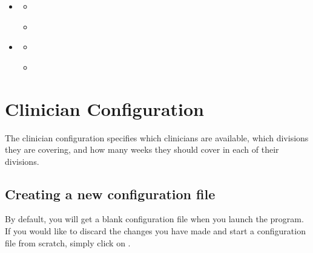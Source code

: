 \documentclass[letterpaper,10pt,english]{sphinxmanual}
\begin{document}
\begin{sphinxShadowBox}
\begin{itemize}
\begin{itemize}
\item {} 
\label{\detokenize{manual:id13}}{\hyperref[\detokenize{manual:holiday-weekends-excel-file}]{}}

\end{itemize}

\item {} 
\label{\detokenize{manual:id14}}{\hyperref[\detokenize{manual:scheduling}]{}}
\begin{itemize}
\item {} 
\label{\detokenize{manual:id15}}{\hyperref[\detokenize{manual:generating-a-schedule}]{}}

\item {} 
\label{\detokenize{manual:id16}}{\hyperref[\detokenize{manual:exporting-a-schedule}]{}}

\end{itemize}

\item {} 
\label{\detokenize{manual:id17}}{\hyperref[\detokenize{manual:sample-output}]{}}
\begin{itemize}
\item {} 
\label{\detokenize{manual:id18}}{\hyperref[\detokenize{manual:yearly-excel-format}]{}}

\item {} 
\label{\detokenize{manual:id19}}{\hyperref[\detokenize{manual:monthly-excel-format}]{}}

\end{itemize}

\end{itemize}
\end{sphinxShadowBox}


\chapter{Clinician Configuration}
\label{\detokenize{manual:clinician-configuration}}\label{\detokenize{manual:id1}}
The clinician configuration specifies which clinicians are available,
which divisions they are covering, and how many weeks they should cover
in each of their divisions.


\section{Creating a new configuration file}
\label{\detokenize{manual:creating-a-new-configuration-file}}
By default, you will get a blank configuration file when you launch
the program. If you would like to discard the changes you have made and
start a configuration file from scratch, simply click on .
\end{document}

